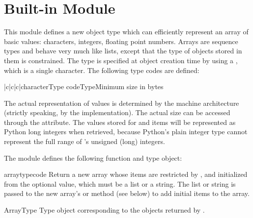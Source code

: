 \section{Built-in Module }
\label{module-array}

This module defines a new object type which can efficiently represent
an array of basic values: characters, integers, floating point
numbers.  Arrays are sequence types and behave very much like lists,
except that the type of objects stored in them is constrained.  The
type is specified at object creation time by using a ,
which is a single character.  The following type codes are defined:

\begin{tableiii}{|c|c|c|}{character}{Type code}{Type}{Minimum size in bytes}
\end{tableiii}

The actual representation of values is determined by the machine
architecture (strictly speaking, by the \C{} implementation).  The actual
size can be accessed through the  attribute.  The values
stored  for  and  items will be represented as
Python long integers when retrieved, because Python's plain integer
type cannot represent the full range of \C{}'s unsigned (long) integers.


The module defines the following function and type object:

\begin{funcdesc}{array}{typecode}
Return a new array whose items are restricted by , and
initialized from the optional  value, which must be a
list or a string.  The list or string is passed to the new array's
 or  method (see below) to add
initial items to the array.
\end{funcdesc}

\begin{datadesc}{ArrayType}
Type object corresponding to the objects returned by
.
\end{datadesc}


